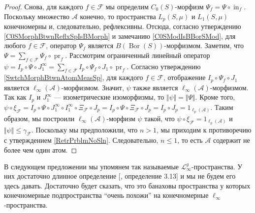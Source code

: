 \documentclass[12pt]{article}
\begin{document}
\begin{proof}
    Снова, для каждого $f\in\mathcal{F}$ мы определим 
    $C_0(S)$-морфизм $\Psi_f=\Psi\circ \operatorname{in}_f$. 
    Поскольку множество $\mathcal{A}$ конечно, то пространства $L_p(S,\mu)$ 
    и $L_1(S,\mu)$ конечномерны и, следовательно, рефлексивны. 
    Отсюда, согласно утверждению \ref{C0SMorphBtwnReflxSpIsBMorph} и 
    замечанию \ref{C0SModIsBBorSMod}, для любого $f\in\mathcal{F}$, 
    оператор $\Psi_f$ является $B(\operatorname{Bor}(S))$-морфизмом. 
    Заметим, что
    $
        \Psi=\sum_{f\in\mathcal{F}} \Psi_f\circ\operatorname{pr}_f.
    $
    Рассмотрим ограниченный линейный оператор
    $
        \psi
        =I_p\circ\Psi\circ J_1^\infty
        =\sum_{f\in\mathcal{F}} 
            I_p\circ\Psi_f\circ J_1\circ\operatorname{pr}_f.
    $
    Согласно утверждению \ref{SwtchMorphBtwnAtomMeasSp}, для 
    каждого $f\in \mathcal{F}$, отображение $I_p\circ \Psi_f\circ J_1$ является 
    $\ell_\infty(\mathcal{A})$-морфизмом. Значит, $\psi$ также является 
    $\ell_\infty(\mathcal{A})$-морфизмом. Так как $I_p$ 
    и $J_1^{\infty}$ --- изометрические изоморфизмы, 
    то $\Vert\psi\Vert=\Vert\Psi\Vert$. Кроме того,
    $
        \psi\circ\xi_\mathcal{F}
        = I_p\circ\Psi\circ J_1^{\infty}\circ 
            I_1^{\infty}\circ \Xi_{\mathcal{F}}\circ J_p
        = I_p\circ\Psi\circ \Xi_{\mathcal{F}}\circ J_p
        = I_p\circ J_p
        = 1_{\ell_p(\mathcal{A})}.
    $
    Таким образом, мы построили $\ell_\infty(\mathcal{A})$-морфизм $\psi$
    такой, что $\psi\circ\xi_{\mathcal{F}}=1_{\ell_p(\mathcal{A})}$ 
    и $\Vert \psi\Vert\leq\gamma_{\mathcal{F}}$. Поскольку мы предположили, 
    что $n>1$, мы приходим к противоречию с утверждением \ref{RetrPrblmNoSln}. 
    Следовательно, $n\leq 1$, то есть $\mathcal{A}$ содержит не более чем один 
    атом.
\end{proof}

В следующем предложении мы упомянем так 
называемые $\mathscr{L}_\infty^g$-пространства. У них достаточно длинное 
определение [\cite{DefFloTensNorOpId}, определение 3.13] и мы не будем его 
здесь давать. Достаточно будет сказать, что это банаховы пространства у которых 
конечномерные подпространства ``очень похожи'' на 
конечномерные $\ell_\infty$-пространства. 
\end{document}
